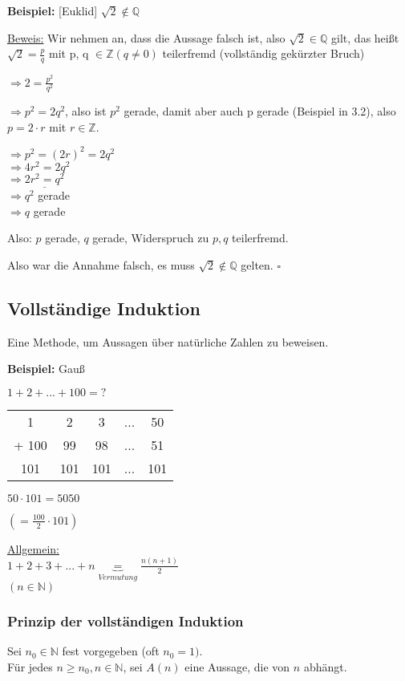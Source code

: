 \documentclass[a4paper, 12pt, twoside] {article}
\begin{document}
\textbf{Beispiel:} [Euklid] $\sqrt{2} \notin \mathbb{Q}$

\underline{Beweis:} Wir nehmen an, dass die Aussage falsch ist, also $\sqrt{2} \in \mathbb{Q}$ gilt,
das heißt $\sqrt{2} = \frac{p}{q}$ mit p, q $\in \mathbb{Z} (q \neq 0)$ teilerfremd (vollständig gekürzter Bruch)

$\Rightarrow 2 = \frac{p^2}{q^2}$

$\Rightarrow p^2 = 2q^2$, also ist $p^2$ gerade, damit aber auch p gerade (Beispiel in 3.2), also $p = 2  \cdot  r$ mit $r \in \mathbb{Z}$.

$\Rightarrow p^2 = (2r)^2 = 2q^2$ \\
$\Rightarrow 4r^2 = 2q^2$ \\
$\Rightarrow \underline{2r^2 = q^2}$ \\
$\Rightarrow q^2$ gerade \\
$\Rightarrow q$ gerade

Also: $p$ gerade, $q$ gerade, Widerspruch zu $p, q$ teilerfremd.

Also war die Annahme falsch, es muss $\sqrt{2} \notin \mathbb{Q}$ gelten. $\square$

\subsection{Vollständige Induktion} %
Eine Methode, um Aussagen über natürliche Zahlen zu beweisen.

\textbf{Beispiel:} Gauß

$ 1 + 2 + ... + 100 = ?$

\begin{tabular}{c c c c c }
1 & 2 & 3 & ... & 50 \\
+ 100 & 99 & 98 & ... & 51 \\
\hline
101 & 101 & 101 & ... & 101 \\
\end{tabular}

$50  \cdot  101 = 5050$

$(= \frac{100}{2}  \cdot  101)$

\underline{Allgemein:} \\
$ 1 + 2 + 3 + ... + n \underbrace{=}_{Vermutung} \frac{n (n+1)}{2}$ \\
$(n \in \mathbb{N})$

\subsubsection{Prinzip der vollständigen Induktion} %
Sei $n_0 \in \mathbb{N}$ fest vorgegeben (oft $n_0 = 1)$. \\
Für jedes $n \geq n_0, n \in \mathbb{N}$, sei $A(n)$ eine Aussage, die von $n$ abhängt.
\end{document}
